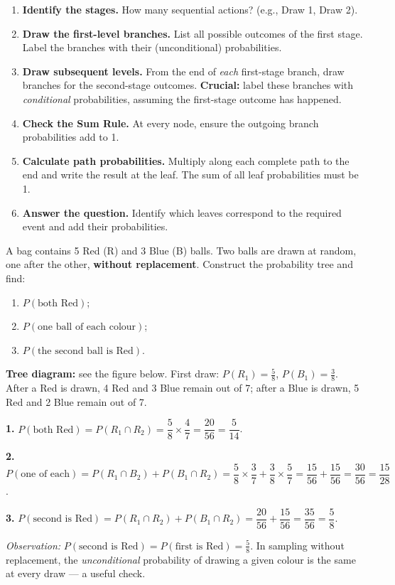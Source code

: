 \documentclass[11pt]{article}
\begin{document}
\begin{methode}
\begin{enumerate}
    \item \textbf{Identify the stages.} How many sequential actions? (e.g., Draw 1, Draw 2).
    \item \textbf{Draw the first-level branches.} List all possible outcomes of the first stage. Label the branches with their (unconditional) probabilities.
    \item \textbf{Draw subsequent levels.} From the end of \emph{each} first-stage branch, draw branches for the second-stage outcomes. \textbf{Crucial:} label these branches with \emph{conditional} probabilities, assuming the first-stage outcome has happened.
    \item \textbf{Check the Sum Rule.} At every node, ensure the outgoing branch probabilities add to 1.
    \item \textbf{Calculate path probabilities.} Multiply along each complete path to the end and write the result at the leaf. The sum of all leaf probabilities must be 1.
    \item \textbf{Answer the question.} Identify which leaves correspond to the required event and add their probabilities.
\end{enumerate}
\end{methode}

\begin{exoresolu}
A bag contains 5 Red (R) and 3 Blue (B) balls. Two balls are drawn at random, one after the other, \textbf{without replacement}. Construct the probability tree and find:
\begin{enumerate}
    \item $P(\text{both Red})$;
    \item $P(\text{one ball of each colour})$;
    \item $P(\text{the second ball is Red})$.
\end{enumerate}
\tcblower
\textbf{Tree diagram:} see the figure below. First draw: $P(R_1)=\frac{5}{8}$, $P(B_1)=\frac{3}{8}$. After a Red is drawn, 4 Red and 3 Blue remain out of 7; after a Blue is drawn, 5 Red and 2 Blue remain out of 7.

\textbf{1.} $P(\text{both Red}) = P(R_1 \cap R_2) = \dfrac{5}{8} \times \dfrac{4}{7} = \dfrac{20}{56} = \dfrac{5}{14}$.

\textbf{2.} $P(\text{one of each}) = P(R_1 \cap B_2) + P(B_1 \cap R_2) = \dfrac{5}{8}\times\dfrac{3}{7} + \dfrac{3}{8}\times\dfrac{5}{7} = \dfrac{15}{56} + \dfrac{15}{56} = \dfrac{30}{56} = \dfrac{15}{28}$.

\textbf{3.} $P(\text{second is Red}) = P(R_1 \cap R_2) + P(B_1 \cap R_2) = \dfrac{20}{56} + \dfrac{15}{56} = \dfrac{35}{56} = \dfrac{5}{8}$.

\emph{Observation:} $P(\text{second is Red}) = P(\text{first is Red}) = \frac{5}{8}$. In sampling without replacement, the \emph{unconditional} probability of drawing a given colour is the same at every draw --- a useful check.
\end{exoresolu}
\end{document}
